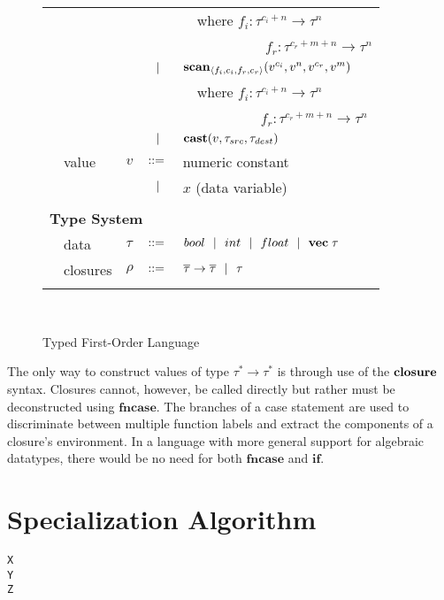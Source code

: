 \documentclass[preprint]{sigplanconf}
\begin{document}
\begin{figure}[h!]
\begin{tabular}{| m{0.01cm}m{1.3cm}m{0.1cm}m{0.2cm}p{5.0cm} |}
  &            &     &           & ~~\small{where $f_i : \tau^{c_i + n} \rightarrow \tau^n$} \\[1.5pt]
  &            &     &           & ~~~~~~~~~~~ \small{$f_r : \tau^{c_r + m + n} \rightarrow \tau^n$} \\[2pt]
  &            &     & $\ \ | \ \ $    & $\mbox{\textbf{scan}} _{ \left\langle f_i, c_i, f_r, c_r \right\rangle} (v^{c_i}, v^n, v^{c_r}, v^{m})$ \\[1.5pt]
  &            &     &           & ~~\small{where $f_i : \tau^{c_i+n} \rightarrow \tau^n$} \\[1.5pt]
  &            &     &           & ~~~~~~~~~~~\small{$f_r : \tau^{c_r + m + n} \rightarrow \tau^n$} \\[2pt]
  &            &     & $\ \ | \ \ $    & $\mbox{\textbf{cast}} (v, \tau_{src}, \tau_{dest})$ \\[5pt]
  & value      & $v$ & $::=$ & numeric constant\\[2pt]
  &            &     & $\ \ | \ \ $    &  $x$  \quad \small{(data variable)} \\[5pt]
  & & & &\\
  \multicolumn{5}{|l|}{\textbf{Type System}} \\[4pt]
  & data     & $\tau$    & $::=$ & $bool \ \ | \ \  int \ \ | \ \  float \ \ | \ \  \mathbf{vec} \; \tau   $ \\[2pt]
  & closures        & $\rho$  & $::=$ & $\overline{\tau} \rightarrow \overline{\tau} \ \ | \ \   \tau$ \\[4pt]

  & & & &\\
  \hline
  \end{tabular}\\[4pt]
\caption{Typed First-Order Language}
\end{figure}

The only way to construct values of type $\tau^* \rightarrow \tau^*$ is through use of the $\mbox{\textbf{closure}}$ syntax. Closures cannot, however, be called directly but rather must be deconstructed using $\textbf{fncase}$. The branches of a case statement are used to discriminate between multiple function labels and extract the components of a closure's environment. In a language with more general support for algebraic datatypes, there would be no need for both $\textbf{fncase}$ and $\textbf{if}$.  

\section{Specialization Algorithm}
\begin{lstlisting}
X
Y
Z
\end{lstlisting}
\end{document}
